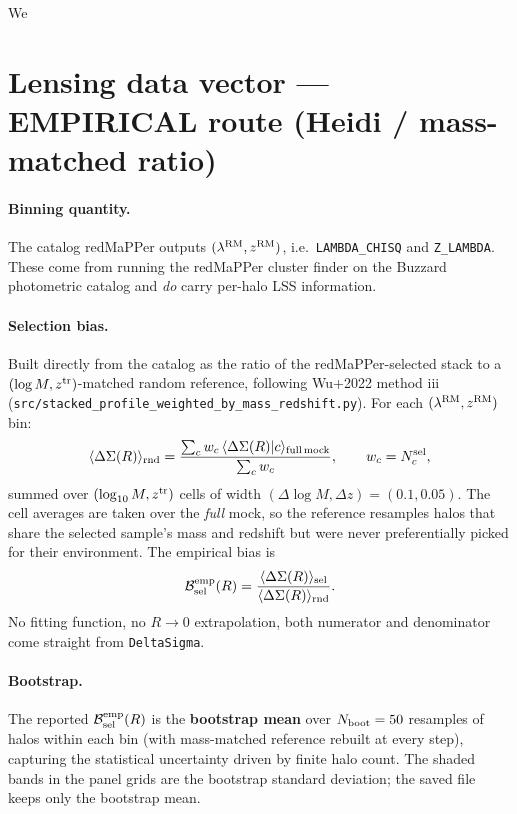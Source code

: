 \documentclass[a4paper, 11pt]{article}
\newcommand{\lrm}{\lambda^{\rm RM}}
\newcommand{\ztr}{z^{\rm tr}}
\newcommand{\zrm}{z^{\rm RM}}
\newcommand{\Bsel}{\mathcal{B}_{\rm sel}}
\newcommand{\blk}[1]{\textcolor{datablockcol}{\texttt{#1}}}
\newcommand{\pyfile}[1]{{\small\texttt{#1}}}
\begin{document}
We

\section{Lensing data vector --- EMPIRICAL route (Heidi / mass-matched ratio)}
\label{sec:emp}

\paragraph{Binning quantity.} The catalog redMaPPer outputs
$(\lrm, \zrm)$, i.e.\ \blk{LAMBDA\_CHISQ} and \blk{Z\_LAMBDA}. These come
from running the redMaPPer cluster finder on the Buzzard photometric
catalog and \emph{do} carry per-halo LSS information.

\paragraph{Selection bias.} Built directly from the catalog as the ratio
of the redMaPPer-selected stack to a $(\log M, \ztr)$-matched random
reference, following Wu+2022 method iii
(\pyfile{src/stacked\_profile\_weighted\_by\_mass\_redshift.py}). For each
$(\lrm, \zrm)$ bin:
\begin{equation}
\label{eq:mass-match}
  \langle \Delta\Sigma(R) \rangle_{\rm rnd}
  = \frac{\sum_c w_c\, \langle\Delta\Sigma(R)|c\rangle_{\rm full\,mock}}
         {\sum_c w_c},\qquad
  w_c = N_c^{\rm sel},
\end{equation}
summed over $(\log_{10} M, \ztr)$ cells of width
$(\Delta\log M, \Delta z) = (0.1, 0.05)$. The cell averages are taken over
the \emph{full} mock, so the reference resamples halos that share the
selected sample's mass and redshift but were never preferentially picked
for their environment. The empirical bias is
\begin{equation*}
  \Bsel^{\rm emp}(R)
  = \frac{\langle \Delta\Sigma(R) \rangle_{\rm sel}}
         {\langle \Delta\Sigma(R) \rangle_{\rm rnd}}.
\end{equation*}
No fitting function, no $R \to 0$ extrapolation, both numerator and
denominator come straight from \blk{DeltaSigma}.

\paragraph{Bootstrap.} The reported $\Bsel^{\rm emp}(R)$ is the
\textbf{bootstrap mean} over $N_{\rm boot} = 50$ resamples of halos within
each bin (with mass-matched reference rebuilt at every step), capturing
the statistical uncertainty driven by finite halo count. The shaded bands
in the panel grids are the bootstrap standard deviation; the saved file
keeps only the bootstrap mean.
\end{document}
